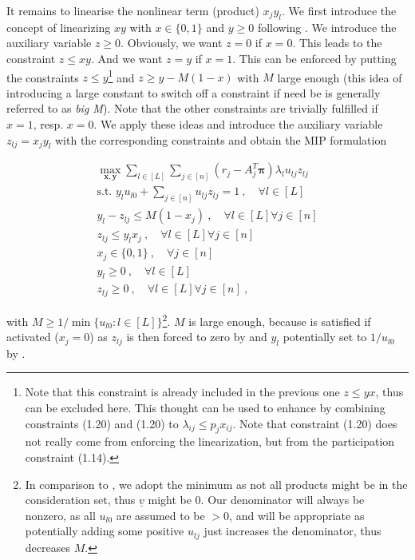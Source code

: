 It remains to linearise the nonlinear term (product) $x_j y_l$. We first introduce the concept of linearizing $x y$ with $x\in \{0, 1\}$ and $y \geq 0$ following \cite{Klein.2017}. We introduce the auxiliary variable $z \geq 0$. Obviously, we want $z = 0$ if $x=0$. This leads to the constraint $z \leq x y$. And we want $z = y$ if $x=1$. This can be enforced by putting the constraints $z \leq y$\footnote{Note that this constraint is already included in the previous one $z \leq y x$, thus can be excluded here. This thought can be used to enhance \cite{Klein.2017} by combining constraints (1.20) and (1.20) to $\lambda_{ij} \leq p_j x_{ij}$. Note that constraint (1.20) does not really come from enforcing the linearization, but from the participation constraint (1.14).} and $z \geq y - M(1-x)$ with $M$ large enough (this idea of introducing a large constant to switch off a constraint if need be is generally referred to as \emph{big M}). Note that the other constraints are trivially fulfilled if $x=1$, resp. $x=0$. We apply these ideas and introduce the auxiliary variable $z_{lj} = x_j y_l$ with the corresponding constraints and obtain the MIP formulation

\begin{align}
\max_{\boldsymbol{x}, \boldsymbol{y}} \sum_{l \in [L]}\sum_{j \in [n]} (r_j - A_j^T\boldsymbol{\pi}) \lambda_l u_{lj} z_{lj}\\
\text{s.t. }y_l u_{l0} + \sum_{j \in [n]} u_{lj} z_{lj} = 1 ~,\quad \forall l \in [L] \label{const-frac}\\
y_l - z_{lj} \leq M(1-x_j) ~,\quad \forall l\in [L]\forall j \in [n]\label{M}\\
z_{lj} \leq y_l x_j ~,\quad \forall l\in [L]\forall j \in [n]\label{z}\\
x_j \in \{0, 1\} ~,\quad \forall j \in [n]\\
y_l \geq 0 ~,\quad \forall l \in [L]\\
z_{lj} \geq 0 ~,\quad \forall l\in [L]\forall j \in [n]~,
\end{align}

with $M \geq 1/\min\{u_{l0}: l\in [L]\}$\footnote{In comparison to \cite{Bront.2009}, we adopt the minimum as not all products might be in the consideration set, thus $\underline{v}$ might be $0$. Our denominator will always be nonzero, as all $u_{l0}$ are assumed to be $>0$, and will be appropriate as potentially adding some positive $u_{lj}$ just increases the denominator, thus decreases $M$.}. $M$ is large enough, because  is satisfied if activated ($x_j = 0$) as $z_{lj}$ is then forced to zero by  and $y_l$ potentially set to $1/u_{l0}$ by . 

